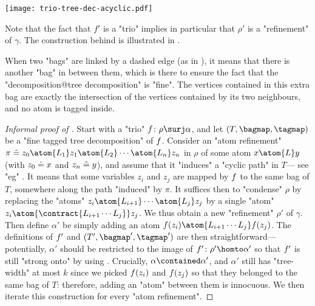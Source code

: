 \begin{figure*}[tbp]
	\centering
	\texttt{[image: trio-tree-dec-acyclic.pdf]}
	\caption{
		\AP\label{fig:path-induced}
        Changing the blue "atom refinement" of $\gamma$ (see )
		so that it induces an "acyclic path".
	}
\end{figure*}

Note that the fact that $f'$ is a "trio" implies in particular that
$\rho'$ is a "refinement" of $\gamma$.
The construction behind  is
illustrated in .
\begin{notation}
	\AP\label{nota:nice-tree-dec}
	When two "bags" are linked by a dashed
	edge (as in ), it means
	that there is another "bag" in between them, which is there
	to ensure the fact that the "decomposition@tree decomposition" is "fine".
	The vertices contained in this extra bag are exactly the intersection of
	the vertices contained by its two neighbours, and no atom is tagged inside.
\end{notation}

\begin{proof}[Informal proof of ]
    Start with a "trio"
    $\fun\colon \rho \surj \alpha$, and let $(T, \bagmap, \tagmap)$ be a "fine tagged tree decomposition" of
    $f$. Consider an "atom refinement"
    $\pi \defeq z_0 \atom{L_1} z_1 \atom{L_2} \cdots \atom{L_n} z_n$
    in $\rho$ of some atom $x \atom{L} y$ (with $z_0 \mathrel{\hat{=}} x$ and $z_n \mathrel{\hat{=}} y$),
    and assume that it "induces"
    a "cyclic path" in $T$--- see "eg" . It means that some variables $z_i$ and $z_j$ are mapped by $f$
    to the same bag of $T$, somewhere along the path "induced" by $\pi$. It suffices then to "condense" $\rho$
    by replacing the "atoms" $z_i \atom{L_{i+1}} \cdots \atom{L_j} z_j$ by a single
    "atom" $z_i \atom{\contract{L_{i+1} \cdots L_j}} z_j$.
    We thus obtain a new "refinement" $\rho'$ of $\gamma$.
    Then define $\alpha'$ be simply adding an atom $\fun(z_i) \atom{L_{i+1} \cdots L_j} \fun(z_j)$.
    The definitions of $f'$ and $(T',\bagmap',\tagmap')$ are then straightforward---potentially,
    $\alpha'$ should be restricted to the image of $\fun'\colon \rho' \homto \alpha'$ so that $f'$ is still "strong onto" by using . Crucially, $\alpha \contained \alpha'$, and $\alpha'$ still has "tree-width" at most $k$ 
    since we picked $f(z_i)$ and $f(z_j)$ so that they belonged to the same bag of $T$: therefore, adding an "atom" between them is innocuous.
	We then iterate this construction for every "atom refinement".
\end{proof}

